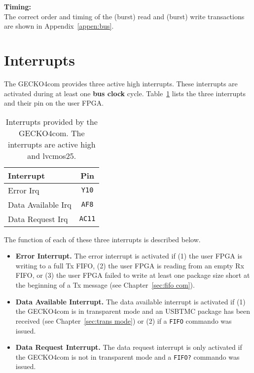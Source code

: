 \textbf{Timing:}\\
The correct order and timing of the (burst) read and (burst) write transactions
are shown in Appendix~\ref{appen:bus}.
\section{Interrupts}
\label{sec: irqs}
The {\sc GECKO4com} provides three active high interrupts. These interrupts are
activated during at least one \textbf{bus clock} cycle. Table~\ref{tab:irqs} lists the
three interrupts and their pin on the user FPGA.
\begin{table}[ht]
\centering%
\begin{tabular}{|l|c|}
\hline
\textbf{Interrupt}&\textbf{Pin}\\
\hline
\hline
Error Irq&\verb+Y10+\\
\hline
Data Available Irq&\verb+AF8+\\
\hline
Data Request Irq&\verb+AC11+\\
\hline
\end{tabular}
\caption{Interrupts provided by the {\sc GECKO4com}. The interrupts are active
high and {\sc lvcmos25}.}
\label{tab:irqs}
\end{table}
\newpage
The function of each of these three interrupts is described below.
\begin{itemize}
\item \textbf{Error Interrupt.} The error interrupt is activated if (1) the user
FPGA is writing to a full Tx FIFO, (2) the user FPGA is reading from an empty Rx
FIFO, or (3) the user FPGA failed to write at least one package size short at
the beginning of a Tx message (see Chapter~\ref{sec:fifo com}).
\item \textbf{Data Available Interrupt.} The data available interrupt is
activated if (1) the {\sc GECKO4com} is in transparent mode and an USBTMC
package has been received (see Chapter~\ref{sec:trans mode}) or (2) if a \verb+FIFO+ 
commando was issued.
\item \textbf{Data Request Interrupt.} The data request interrupt is only
activated if the {\sc GECKO4com} is not in transparent mode and a \verb+FIFO?+
commando was issued.
\end{itemize}
